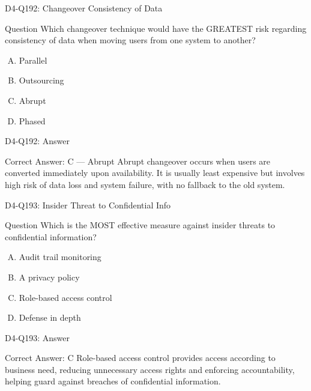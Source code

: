 \documentclass{beamer}
\begin{document}
	\begin{frame}{D4-Q192: Changeover Consistency of Data}
		\begin{block}{Question}
			Which changeover technique would have the GREATEST risk regarding consistency of data when moving users from one system to another?
		\end{block}
		\begin{enumerate}[(A)]
			\item Parallel
			\item Outsourcing
			\item Abrupt
			\item Phased
		\end{enumerate}
	\end{frame}
	\begin{frame}{D4-Q192: Answer}
		\begin{block}{Correct Answer: C --- Abrupt}
			Abrupt changeover occurs when users are converted immediately upon availability. It is usually least expensive but involves high risk of data loss and system failure, with no fallback to the old system.
		\end{block}
	\end{frame}
	
	\begin{frame}{D4-Q193: Insider Threat to Confidential Info}
		\begin{block}{Question}
			Which is the MOST effective measure against insider threats to confidential information?
		\end{block}
		\begin{enumerate}[(A)]
			\item Audit trail monitoring
			\item A privacy policy
			\item Role-based access control
			\item Defense in depth
		\end{enumerate}
	\end{frame}
	\begin{frame}{D4-Q193: Answer}
		\begin{block}{Correct Answer: C}
			Role-based access control provides access according to business need, reducing unnecessary access rights and enforcing accountability, helping guard against breaches of confidential information.
		\end{block}
	\end{frame}
	
\end{document}
